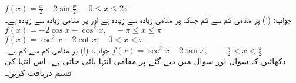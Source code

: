 $f(x)=\tfrac{x}{2}-2\sin\tfrac{x}{2},\quad 0\le x\le 2\pi$\\
جواب:\quad
(ا)  پر مقامی کم سے کم  جبکہ  پر مقامی زیادہ سے زیادہ  ہے اور  پر مقامی زیادہ سے زیادہ  ہے۔
$f(x)=-2\cos x-\cos^2x,\quad -\pi\le x\le \pi$
$f(x)=\csc^2x-2\cot x,\quad 0<x<\pi$\\
جواب:\quad
(ا)  پر مقامی کم سے کم  ہے۔
$f(x)=\sec^2x-2\tan x,\quad -\tfrac{\pi}{2}<x<\tfrac{\pi}{2}$
\\
دکھائیں کہ سوال  اور سوال  میں دیے گئے  پر مقامی انتہا پائی جاتی ہے۔ اس انتہا کی قسم دریافت کریں۔

